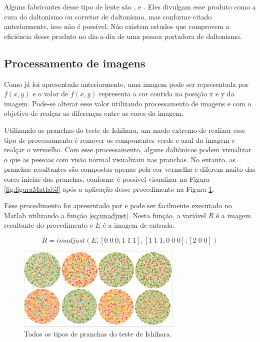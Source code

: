\documentclass[	12pt, Times, openright, twoside, a4paper, english, brazil]{abntex2}
\begin{document}
Alguns fabricantes desse tipo de lente são ,  e . Eles divulgam esse produto como a cura do daltonismo ou corretor de daltonismo, mas conforme citado anteriormente, isso não é possível. Não existem estudos que comprovem a eficiência desse produto no dia-a-dia de uma pessoa portadora de daltonismo.

\subsection{Processamento de imagens}

Como já foi apresentado anteriormente, uma imagem pode ser representada por $f(x,y)$ e o valor de $f(x,y)$ representa a cor contida na posição x e y da imagem. Pode-se alterar esse valor utilizando processamento de imagens e com o objetivo de realçar as diferenças entre as cores da imagem.

Utilizando as pranchas do teste de Ishihara, um modo extremo de realizar esse tipo de processamento é remover os componentes verde e azul da imagem e realçar o vermelho. Com esse processamento, alguns daltônicos podem visualizar o que as pessoas com visão normal visualizam nas pranchas. No entanto, as pranchas resultantes são compostas apenas pela cor vermelha e diferem muito das cores inicias das pranchas, conforme é possível visualizar na Figura \ref{fig:figuraMatlab3} após a aplicação desse procedimento na Figura \ref{fig:figuraMatlab1}. 

Esse procedimento foi apresentado por  e pode ser facilmente executado no Matlab utilizando a função \ref{eq:imadjust}. Nesta função, a variável $R$ é a imagem resultante do procedimento e $E$ é a imagem de entrada.

\begin{equation}
R=imadjust (E,[0 \; 0 \; 0; 1 \; 1 \; 1],[1 \; 1 \; 1; 0 \; 0 \; 0],[2 \; 0 \; 0]) \label{eq:imadjust}
\end{equation}

\begin{figure}[!htb]
\centering \includegraphics[width=0.7\textwidth]{figuraMatlab1.PNG}
\caption{Todos os tipos de pranchas do teste de Ishihara. \label{fig:figuraMatlab1}}
\end{figure}
\end{document}
